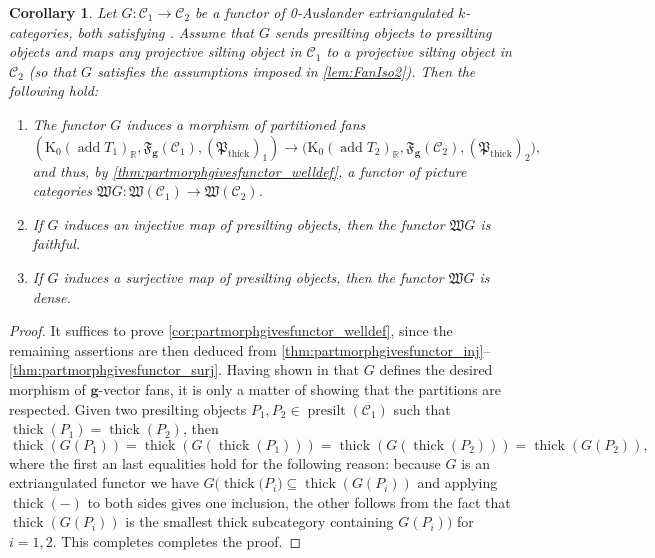 \documentclass[10pt,twoside, a4paper,reqno]{amsart}
\DeclareMathOperator{\presilt}{presilt}
\DeclareMathOperator{\add}{add}
\DeclareMathOperator{\thick}{thick}
\newcommand{\partfan}[1]{\mathfrak{F}_{\bfg}(#1)}
\newcommand{\Wfrak}{\mathfrak{W}}
\newcommand{\Pfrak}{\mathfrak{P}}
\newcommand{\R}{\mathbb{R}}
\newcommand{\calC}{\mathcal{C}}
\newcommand{\K}{\mathrm{K}}
\newcommand{\bfg}{\mathbf{g}}
\newtheorem{corollary}[theorem]{Corollary}
\theoremstyle{definition}
\begin{document}
\begin{corollary}\label{cor:partmorphgivesfunctor}
    Let ${G}\colon \calC_1\xrightarrow{}\calC_2$ be a functor of 0-Auslander extriangulated $k$-categories, both satisfying . {Assume that $G$ sends presilting objects to presilting objects and maps any projective silting object in $\calC_1$ to a projective silting object in $\calC_2$ ({{so that $G$ satisfies} the assumptions imposed in \eqref{lem:FanIso2}}). Then the following hold:}
    \begin{enumerate}
        \item\label{cor:partmorphgivesfunctor_welldef} {The functor} $G$ induces a morphism of partitioned fans \[(\K_0(\add T_1)_\R,\partfan{\calC_1}, (\Pfrak_{\thick})_1)\xrightarrow{} (\K_0(\add T_2)_\R,\partfan{\calC_2}, (\Pfrak_{\thick})_2{)},\] and thus, by \eqref{thm:partmorphgivesfunctor_welldef}, a functor of picture categories $\Wfrak {G}\colon\Wfrak(\calC_1)\xrightarrow{}\Wfrak(\calC_2)$.
        \item\label{cor:partmorphgivesfunctor_inj} If ${G}$ induces an injective map of presilting objects, then the functor $\Wfrak {G}$ is faithful.
        \item\label{cor:partmorphgivesfunctor_surj} If ${G}$ induces a surjective map of presilting objects, then the functor $\Wfrak {G}$ is dense.
    \end{enumerate}
\end{corollary}
\begin{proof}
    It suffices to prove \eqref{cor:partmorphgivesfunctor_welldef}, since the remaining assertions are then deduced from \eqref{thm:partmorphgivesfunctor_inj}--{\eqref{thm:partmorphgivesfunctor_surj}}. Having shown in  that {$G$} defines {the desired} morphism of $\bfg$-vector fans, it is only a matter of showing that the partitions are respected.
    Given two presilting objects $P_1,P_2\in\presilt(\calC_1)$ such that $\thick(P_1)=\thick(P_2)$, then
    \begin{equation*}
        \thick(G(P_1)) = \thick(G(\thick(P_1))) = 
\thick(G(\thick(P_2))) = \thick(G(P_2)),
    \end{equation*}
 {where the first an last equalities hold for the following reason: because $G$ is an extriangulated functor {we have $G(\thick {(}P_i{)} \subseteq \thick(G(P_i))$ and applying $\thick(-)$ to both sides gives one inclusion, the other follows from the fact that $\thick(G(P_i))$ is the smallest thick subcategory containing $G(P_i))$ for $i=1,2$.}} {This completes} completes the proof.
\end{proof}
\end{document}

